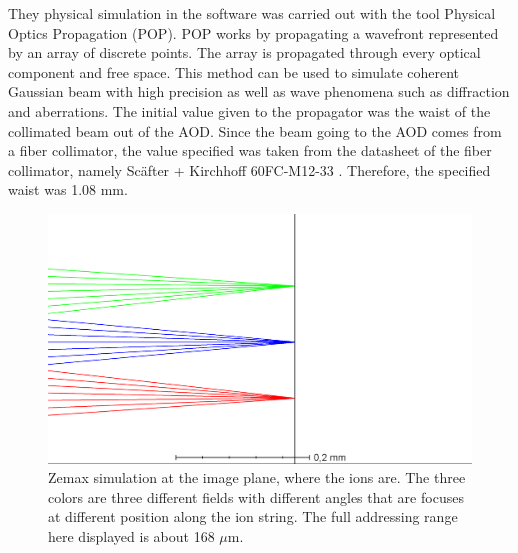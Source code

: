 They physical simulation in the software was carried out with the tool Physical Optics Propagation (POP). POP works by propagating a wavefront represented by an array of discrete points. The array is propagated through every optical component and free space. This method can be used to simulate coherent Gaussian beam with high precision as well as wave phenomena such as diffraction and aberrations. The initial value given to the propagator was the waist of the collimated beam out of the AOD. Since the beam going to the AOD comes from a fiber collimator, the value specified was taken from the datasheet of the fiber collimator, namely Sc\"after + Kirchhoff 60FC-M12-33 \cite{fibercollimator}. Therefore, the specified waist was 1.08 mm.
\begin{figure}
     \centering
     \centering
     \includegraphics[width=.8\textwidth]{img/zemaxrange}
     \caption{Zemax simulation at the image plane, where the ions are. The three colors are three different fields with different angles that are focuses at different position along the ion string. The full addressing range here displayed is about 168 $\mu$m.}
     \label{zemaxrange}
\end{figure}

